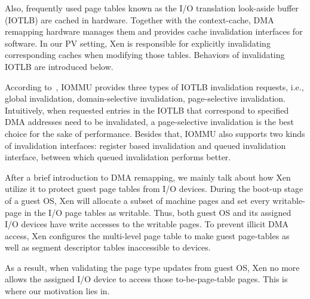 Also, frequently used page tables known as the I/O translation look-aside buffer (IOTLB) are cached in hardware. Together with the context-cache, DMA remapping hardware manages them and provides cache invalidation interfaces for software. In our PV setting, Xen is responsible for explicitly invalidating corresponding caches when modifying those tables. Behaviors of invalidating IOTLB are introduced below.


According to~\cite{intelvt}, IOMMU provides three types of IOTLB invalidation requests, i.e., global invalidation, domain-selective invalidation, page-selective invalidation. Intuitively, when requested entries in the IOTLB that correspond to specified DMA addresses need to be invalidated, a page-selective invalidation is the best choice for the sake of performance. Besides that, IOMMU also supports two kinds of invalidation interfaces: register based invalidation and queued invalidation interface, between which queued invalidation performs better.

After a brief introduction to DMA remapping, we mainly talk about how Xen utilize it to protect guest page tables from I/O devices. During the boot-up stage of a guest OS, Xen will allocate a subset of machine pages and set every writable-page in the I/O page tables as writable. Thus, both guest OS and its assigned I/O devices have write accesses to the writable pages. To prevent illicit DMA access, Xen configures the multi-level page table to make guest page-tables as well as segment descriptor tables inaccessible to devices.

As a result, when validating the page type updates from guest OS, Xen no more allows the assigned I/O device to access those to-be-page-table pages. This is where our motivation lies in.
